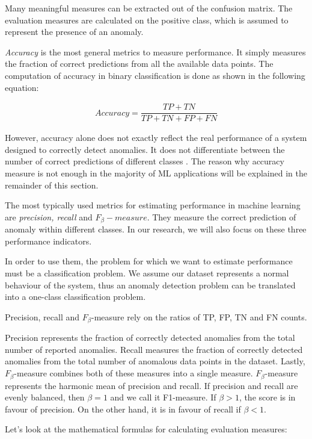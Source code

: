 Many meaningful measures can be extracted out of the confusion matrix. The evaluation measures are calculated on the positive class, which is assumed to represent the presence of an anomaly.

\textit{Accuracy} is the most general metrics to measure performance. It simply measures the fraction of correct predictions from all the available data points. The computation of accuracy in binary classification is done as shown in the following equation:

\begin{align}
    Accuracy = \dfrac{TP + TN}{TP + TN + FP + FN}
\end{align}

However, accuracy alone does not exactly reflect the real performance of a system designed to correctly detect anomalies. It does not differentiate between the number of correct predictions of different classes \cite{performanceEvaluation2006}. The reason why accuracy measure is not enough in the majority of ML applications will be explained in the remainder of this section. 

The most typically used metrics for estimating performance in machine learning are \textit{precision, recall} and ${F_{\beta}-measure}$. They measure the correct prediction of anomaly within different classes. In our research, we will also focus on these three  performance indicators.

In order to use them, the problem for which we want to estimate performance must be a classification problem. We assume our dataset represents a normal behaviour of the system, thus an anomaly detection problem can be translated into a one-class classification problem. 

Precision, recall and $F_{\beta}$-measure rely on the ratios of TP, FP, TN and FN counts. 

Precision represents the fraction of correctly detected anomalies from the total number of reported anomalies. Recall measures the fraction of correctly detected anomalies from the total number of anomalous data points in the dataset. Lastly, $F_{\beta}$-measure combines both of these measures into a single measure. $F_{\beta}$-measure represents the harmonic mean of precision and recall. If precision and recall are evenly balanced, then $\beta = 1$ and we call it F1-measure. If $\beta > 1$, the score is in favour of precision. On the other hand, it is in favour of recall if $\beta < 1$. 

Let's look at the mathematical formulas for calculating evaluation measures:

